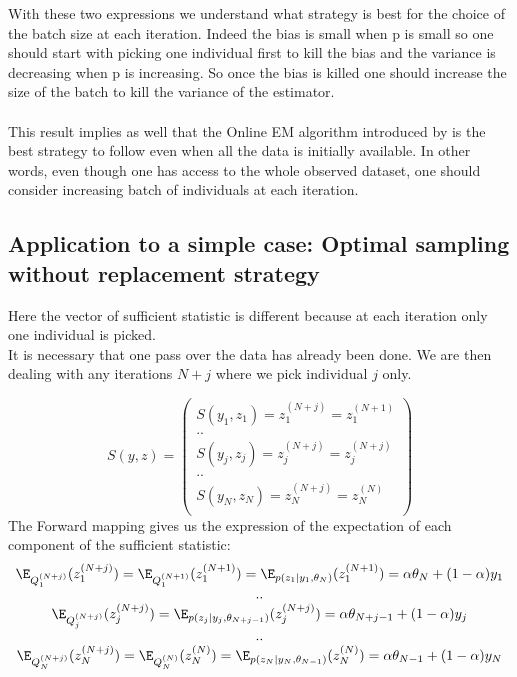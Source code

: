 \documentclass[a4paper]{article}
\theoremstyle{plain}
\theoremstyle{plain}
\theoremstyle{definition}
\begin{document}
With these two expressions we understand what strategy is best for the choice of the batch size at each iteration. Indeed the bias is small when p is small so one should start with picking one individual first to kill the bias and the variance is decreasing when p is increasing. So once the bias is killed one should increase the size of the batch to kill the variance of the estimator.\\
\\
This result implies as well that the Online EM algorithm introduced by \citep{cappe} is the best strategy to follow even when all the data is initially available. In other words, even though one has access to the whole observed dataset, one should consider increasing batch of individuals at each iteration.

\subsection{Application to a simple case: Optimal sampling without replacement strategy}
Here the vector of sufficient statistic is different because at each iteration only one individual is picked.\\
It is necessary that one pass over the data has already been done. We are then dealing with any iterations $N+j$ where we pick individual $j$ only.

\begin{equation}
S(y,z) = 
\left(
\begin{array}{c}
S(y_1,z_1) =z_1^{(N+j)}= z_1^{(N+1)}\\
..\\
S(y_j,z_j) =z_j^{(N+j)}= z_j^{(N+j)}\\
..\\
S(y_N,z_N) =z_N^{(N+j)}= z_N^{(N)}\\
\end{array}
\right)
\end{equation}
\noindent The Forward mapping gives us the expression of the expectation of each component of the sufficient statistic:
\begin{equation}
\begin{matrix} 
\E_{Q_1^{(N+j)}}(z_1^{(N+j)})= \E_{Q_1^{(N+1)}}(z_1^{(N+1)})=\E_{p(z_1|y_1,\theta_N)}(z_1^{(N+1)}) = \alpha \theta_{N} + (1-\alpha)y_1\\
..\\
\E_{Q_j^{(N+j)}}(z_j^{(N+j)})=\E_{p(z_j|y_j,\theta_{N+j-1})}(z_j^{(N+j)})= \alpha \theta_{N+j-1} + (1-\alpha)y_j\\
..\\
\E_{Q_N^{(N+j)}}(z_N^{(N+j)})= \E_{Q_N^{(N)}}(z_N^{(N)})=\E_{p(z_N|y_N,\theta_{N-1})}(z_N^{(N)}) = \alpha \theta_{N-1} + (1-\alpha)y_N
\end{matrix}
\end{equation}
\end{document}
